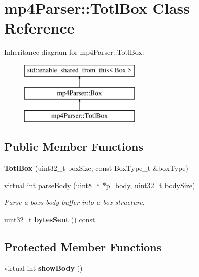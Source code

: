 \hypertarget{classmp4_parser_1_1_totl_box}{}\section{mp4\+Parser\+::Totl\+Box Class Reference}
\label{classmp4_parser_1_1_totl_box}
Inheritance diagram for mp4\+Parser\+::Totl\+Box\+:\begin{figure}[H]
\begin{center}
\leavevmode
\includegraphics[height=3.000000cm]{classmp4_parser_1_1_totl_box}
\end{center}
\end{figure}
\subsection*{Public Member Functions}
\begin{DoxyCompactItemize}
\item 
\mbox{\label{classmp4_parser_1_1_totl_box_a6822fd80c43e0489890447ac53f3dc6e}} 
{\bfseries Totl\+Box} (uint32\+\_\+t box\+Size, const Box\+Type\+\_\+t \&box\+Type)
\item 
virtual int \mbox{\hyperlink{classmp4_parser_1_1_totl_box_a352271d47a04f7884e81978ce4e8d697}{parse\+Body}} (uint8\+\_\+t $\ast$p\+\_\+body, uint32\+\_\+t body\+Size)
\begin{DoxyCompactList}\small\item\em Parse a box\textquotesingle{}s body buffer into a box structure. \end{DoxyCompactList}\item 
\mbox{\label{classmp4_parser_1_1_totl_box_a60e4a10765601a462eb190685886f91b}} 
uint32\+\_\+t {\bfseries bytes\+Sent} () const
\end{DoxyCompactItemize}
\subsection*{Protected Member Functions}
\begin{DoxyCompactItemize}
\item 
\mbox{\label{classmp4_parser_1_1_totl_box_a758e036aabb2b60af9a29a4d2ffe96d7}} 
virtual int {\bfseries show\+Body} ()
\end{DoxyCompactItemize}
